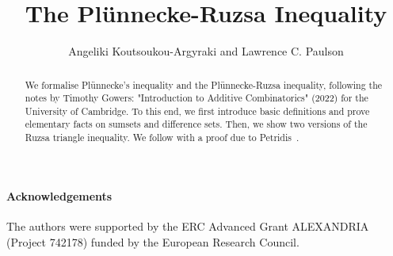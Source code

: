 \documentclass[11pt,a4paper]{article}
\begin{document}
\title{The Pl\"{u}nnecke-Ruzsa Inequality}
\author{Angeliki Koutsoukou-Argyraki and Lawrence C. Paulson}
\maketitle

\begin{abstract}
We formalise Pl\"{u}nnecke's inequality and the Pl\"{u}nnecke-Ruzsa inequality, 
following the notes by Timothy Gowers: "Introduction to Additive
Combinatorics" (2022) for the University of Cambridge. To this end, we first introduce basic definitions
and prove elementary facts on sumsets and difference sets. Then, we show two versions of
the Ruzsa triangle inequality. We follow with a proof due to Petridis~\cite{petridis-plunnecke-ruzsa}.
\end{abstract}

\newpage
\tableofcontents

\paragraph*{Acknowledgements}
The authors were supported by the ERC Advanced Grant ALEXANDRIA (Project 742178) funded by the European Research Council. 

\newpage





\end{document}
